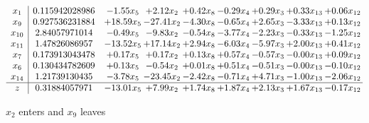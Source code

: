 \documentclass[8pt]{article}
\begin{document}
 \[\begin{array}{c| c c@{\hskip 2pt} c@{\hskip 2pt} c@{\hskip 2pt} c@{\hskip 2pt} c@{\hskip 2pt} c@{\hskip 2pt} c@{\hskip 2pt} }
 x_{1}   &  0.115942028986 & -1.55 x_{5} & +  2.12 x_{2} & +  0.42 x_{8} & -0.29 x_{4} & +  0.29 x_{3} & +  0.33 x_{13} & +  0.06 x_{12}\\
 x_{9}   &  0.927536231884 & + 18.59 x_{5} & -27.41 x_{2} & -4.30 x_{8} & -0.65 x_{4} & +  2.65 x_{3} & -3.33 x_{13} & +  0.13 x_{12}\\
 x_{10}   &  2.84057971014 & -0.49 x_{5} & -9.83 x_{2} & -0.54 x_{8} & -3.77 x_{4} & -2.23 x_{3} & -0.33 x_{13} & -1.25 x_{12}\\
 x_{11}   &  1.47826086957 & -13.52 x_{5} & + 17.14 x_{2} & +  2.94 x_{8} & -6.03 x_{4} & -5.97 x_{3} & +  2.00 x_{13} & +  0.41 x_{12}\\
 x_{7}   &  0.173913043478 & +  0.17 x_{5} & +  0.17 x_{2} & +  0.13 x_{8} & +  0.57 x_{4} & -0.57 x_{3} & -0.00 x_{13} & +  0.09 x_{12}\\
 x_{6}   &  0.130434782609 & +  0.13 x_{5} & -0.54 x_{2} & +  0.01 x_{8} & +  0.51 x_{4} & -0.51 x_{3} & -0.00 x_{13} & -0.10 x_{12}\\
 x_{14}   &  1.21739130435 & -3.78 x_{5} & -23.45 x_{2} & -2.42 x_{8} & -0.71 x_{4} & +  4.71 x_{3} & -1.00 x_{13} & -2.06 x_{12}\\
\hline
z    &  0.31884057971 & -13.01 x_{5} & +  7.99 x_{2} & +  1.74 x_{8} & +  1.87 x_{4} & +  2.13 x_{3} & +  1.67 x_{13} & -0.17 x_{12}\\
\end{array}\]


 $ x_{2} $ enters and $ x_{9} $ leaves 
\end{document}
